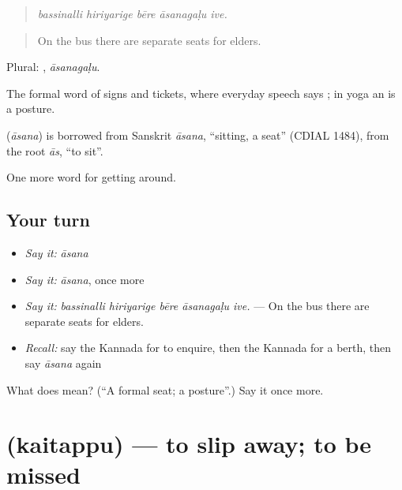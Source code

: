 \begin{quote}
\emph{bassinalli hiriyarige bēre āsanagaḷu ive.}
\end{quote}

\begin{quote}
On the bus there are separate seats for elders.
\end{quote}

Plural: , \emph{āsanagaḷu}.

The formal word of signs and tickets, where everyday speech says ; in yoga an  is a posture.

\begin{cousinweb}
\textbf{} (\emph{āsana}) is borrowed from Sanskrit \emph{āsana}, \textquotedblleft{}sitting, a seat\textquotedblright{} (CDIAL 1484), from the root \emph{ās}, \textquotedblleft{}to sit\textquotedblright{}.
\end{cousinweb}

\begin{grammarlens}[title={What you've built}]
One more word for getting around.
\end{grammarlens}

\subsection*{Your turn}
\begin{itemize}
\raggedright
  \item \emph{Say it:} \emph{āsana}
  \item \emph{Say it:} \emph{āsana}, once more
  \item \emph{Say it:} \emph{bassinalli hiriyarige bēre āsanagaḷu ive.} — On the bus there are separate seats for elders.
  \item \emph{Recall:} say the Kannada for to enquire, then the Kannada for a berth, then say \emph{āsana} again
\end{itemize}

\begin{tcolorbox}[breakable,colback=teal!4,colframe=teal!35!black,title={Before you move on}]
What does  mean? (\textquotedblleft{}A formal seat; a posture\textquotedblright{}.) Say it once more.
\end{tcolorbox}
\section[\texorpdfstring{\kn{ಕೈತಪ್ಪು} (kaitappu)}{ಕೈತಪ್ಪು (kaitappu)}]{ (kaitappu) — to slip away; to be missed}


